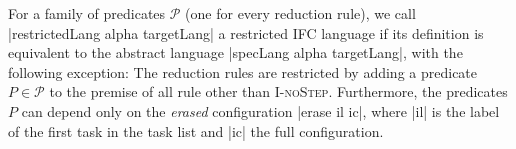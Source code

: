 


  
  


\begin{definition}
  \label{def:restricted}
  For a family of predicates $\mathcal P$ (one for every reduction
  rule), we call
  |restrictedLang alpha targetLang| a restricted IFC language
  if its definition is equivalent to the abstract language
  |specLang alpha targetLang|, with the following exception:
  The reduction rules are restricted
  by adding a predicate $P \in \mathcal P$ to the premise of
  all rule other than \textsc{I-noStep}.  Furthermore, the predicates $P$
  can depend only on the \textit{erased} configuration
  |erase il ic|, where |il| is the label of the first task
  in the task list and |ic| the full configuration.
\end{definition}

